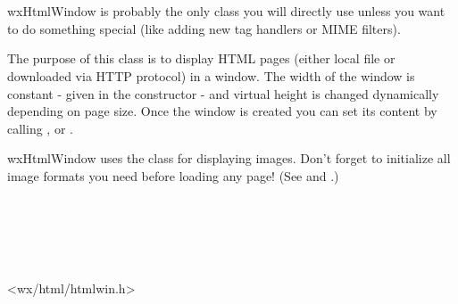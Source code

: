 %
%

\section{}\label{wxhtmlwindow}

wxHtmlWindow is probably the only class you will directly use
unless you want to do something special (like adding new tag
handlers or MIME filters).

The purpose of this class is to display HTML pages (either local
file or downloaded via HTTP protocol) in a window. The width
of the window is constant - given in the constructor - and virtual height
is changed dynamically depending on page size.
Once the window is created you can set its content by calling 
,
 or
.


wxHtmlWindow uses the  class for displaying images.
Don't forget to initialize all image formats you need before loading any page!
(See  and
.)


\\
\\
\\
\\


<wx/html/htmlwin.h>




\twocolwidtha{5cm}
\begin{twocollist}\itemsep=0pt
\end{twocollist}


